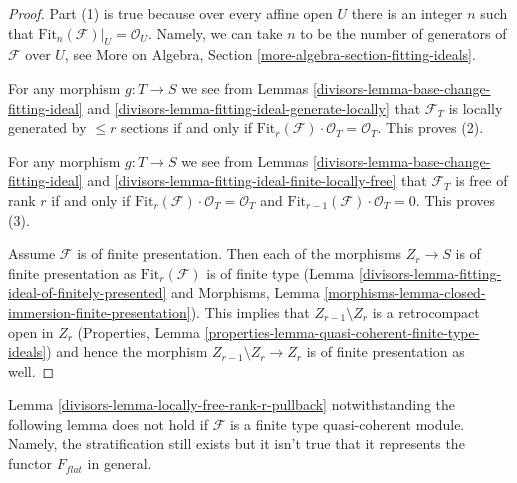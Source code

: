 \begin{proof}

Part (1) is true because over every affine open $U$ there is an integer $n$
such that $\text{Fit}_n(\mathcal{F})|_U = \mathcal{O}_U$. Namely, we can
take $n$ to be the number of generators of $\mathcal{F}$ over $U$, see
More on Algebra, Section \ref{more-algebra-section-fitting-ideals}.

\medskip\noindent
For any morphism $g : T \to S$ we see from
Lemmas \ref{divisors-lemma-base-change-fitting-ideal} and
\ref{divisors-lemma-fitting-ideal-generate-locally}
that $\mathcal{F}_T$ is locally generated by $\leq r$ sections if and only if
$\text{Fit}_r(\mathcal{F}) \cdot \mathcal{O}_T = \mathcal{O}_T$.
This proves (2).

\medskip\noindent
For any morphism $g : T \to S$ we see from
Lemmas \ref{divisors-lemma-base-change-fitting-ideal} and
\ref{divisors-lemma-fitting-ideal-finite-locally-free}
that $\mathcal{F}_T$ is free of rank $r$ if and only if
$\text{Fit}_r(\mathcal{F}) \cdot \mathcal{O}_T = \mathcal{O}_T$ and
$\text{Fit}_{r - 1}(\mathcal{F}) \cdot \mathcal{O}_T = 0$.
This proves (3).

\medskip\noindent
Assume $\mathcal{F}$ is of finite presentation. Then each of the morphisms
$Z_r \to S$ is of finite presentation as $\text{Fit}_r(\mathcal{F})$
is of finite type (Lemma \ref{divisors-lemma-fitting-ideal-of-finitely-presented} and
Morphisms, Lemma \ref{morphisms-lemma-closed-immersion-finite-presentation}).
This implies that $Z_{r - 1} \setminus Z_r$ is a retrocompact open in $Z_r$
(Properties, Lemma \ref{properties-lemma-quasi-coherent-finite-type-ideals})
and hence the morphism $Z_{r - 1} \setminus Z_r \to Z_r$
is of finite presentation as well.
\end{proof}

Lemma \ref{divisors-lemma-locally-free-rank-r-pullback} notwithstanding
the following lemma does not hold if $\mathcal{F}$ is a finite type
quasi-coherent module. Namely, the stratification still exists but
it isn't true that it represents the functor $F_{flat}$ in general.

